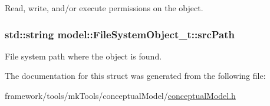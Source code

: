 Read, write, and/or execute permissions on the object. 

\subsubsection[{\texorpdfstring{src\+Path}{srcPath}}]{\setlength{\rightskip}{0pt plus 5cm}std\+::string model\+::\+File\+System\+Object\+\_\+t\+::src\+Path}\hypertarget{structmodel_1_1_file_system_object__t_a140cf9dc6044950e664624da216e1b03}{}\label{structmodel_1_1_file_system_object__t_a140cf9dc6044950e664624da216e1b03}


File system path where the object is found. 



The documentation for this struct was generated from the following file\+:\begin{DoxyCompactItemize}
\item 
framework/tools/mk\+Tools/conceptual\+Model/\hyperlink{conceptual_model_8h}{conceptual\+Model.\+h}\end{DoxyCompactItemize}
